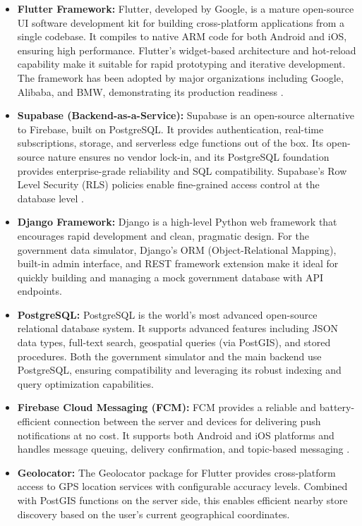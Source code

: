 \begin{itemize}
    \item \textbf{Flutter Framework:} Flutter, developed by Google, is a mature open-source UI software development kit for building cross-platform applications from a single codebase. It compiles to native ARM code for both Android and iOS, ensuring high performance. Flutter's widget-based architecture and hot-reload capability make it suitable for rapid prototyping and iterative development. The framework has been adopted by major organizations including Google, Alibaba, and BMW, demonstrating its production readiness \cite{flutter_docs}.

    \item \textbf{Supabase (Backend-as-a-Service):} Supabase is an open-source alternative to Firebase, built on PostgreSQL. It provides authentication, real-time subscriptions, storage, and serverless edge functions out of the box. Its open-source nature ensures no vendor lock-in, and its PostgreSQL foundation provides enterprise-grade reliability and SQL compatibility. Supabase's Row Level Security (RLS) policies enable fine-grained access control at the database level \cite{supabase_docs}.

    \item \textbf{Django Framework:} Django is a high-level Python web framework that encourages rapid development and clean, pragmatic design. For the government data simulator, Django's ORM (Object-Relational Mapping), built-in admin interface, and REST framework extension make it ideal for quickly building and managing a mock government database with API endpoints.

    \item \textbf{PostgreSQL:} PostgreSQL is the world's most advanced open-source relational database system. It supports advanced features including JSON data types, full-text search, geospatial queries (via PostGIS), and stored procedures. Both the government simulator and the main backend use PostgreSQL, ensuring compatibility and leveraging its robust indexing and query optimization capabilities.

    \item \textbf{Firebase Cloud Messaging (FCM):} FCM provides a reliable and battery-efficient connection between the server and devices for delivering push notifications at no cost. It supports both Android and iOS platforms and handles message queuing, delivery confirmation, and topic-based messaging \cite{firebase_docs}.

    \item \textbf{Geolocator:} The Geolocator package for Flutter provides cross-platform access to GPS location services with configurable accuracy levels. Combined with PostGIS functions on the server side, this enables efficient nearby store discovery based on the user's current geographical coordinates.
\end{itemize}

